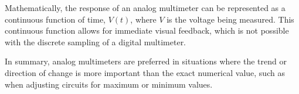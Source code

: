Mathematically, the response of an analog multimeter can be represented as a continuous function of time, \( V(t) \), where \( V \) is the voltage being measured. This continuous function allows for immediate visual feedback, which is not possible with the discrete sampling of a digital multimeter.

In summary, analog multimeters are preferred in situations where the trend or direction of change is more important than the exact numerical value, such as when adjusting circuits for maximum or minimum values.

